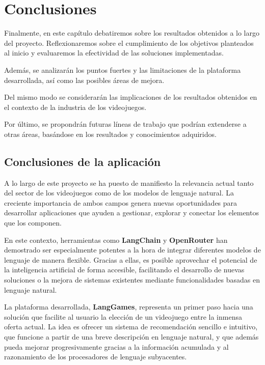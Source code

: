 \chapter{Conclusiones}

Finalmente, en este capítulo debatiremos sobre los resultados obtenidos a lo largo del proyecto. Reflexionaremos sobre el cumplimiento de los objetivos planteados al inicio y evaluaremos la efectividad de las soluciones implementadas. 

Además, se analizarán los puntos fuertes y las limitaciones de la plataforma desarrollada, así como las posibles áreas de mejora. 


Del mismo modo se considerarán las implicaciones de los resultados obtenidos en el contexto de la industria de los videojuegos. 


Por último, se propondrán futuras líneas de trabajo que podrían extenderse a otras áreas, basándose en los resultados y conocimientos adquiridos.  

\newpage

\section{Conclusiones de la aplicación}

A lo largo de este proyecto se ha puesto de manifiesto la relevancia actual tanto del sector de los videojuegos como de los modelos de lenguaje natural. La creciente importancia de ambos campos genera nuevas oportunidades para desarrollar aplicaciones que ayuden a gestionar, explorar y conectar los elementos que los componen.

En este contexto, herramientas como \textbf{LangChain} y \textbf{OpenRouter} han demostrado ser especialmente potentes a la hora de integrar diferentes modelos de lenguaje de manera flexible. Gracias a ellas, es posible aprovechar el potencial de la inteligencia artificial de forma accesible, facilitando el desarrollo de nuevas soluciones o la mejora de sistemas existentes mediante funcionalidades basadas en lenguaje natural.

La plataforma desarrollada, \textbf{LangGames}, representa un primer paso hacia una solución que facilite al usuario la elección de un videojuego entre la inmensa oferta actual. La idea es ofrecer un sistema de recomendación sencillo e intuitivo, que funcione a partir de una breve descripción en lenguaje natural, y que además pueda mejorar progresivamente gracias a la información acumulada y al razonamiento de los procesadores de lenguaje subyacentes.

